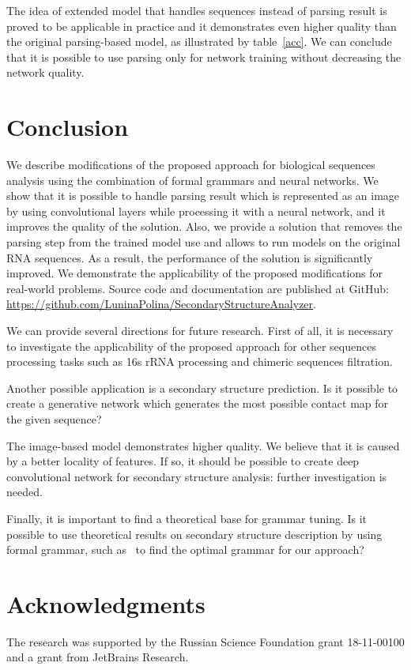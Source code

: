 \documentclass[12pt,a4paper]{cibb}
\begin{document}
The idea of extended model that handles sequences instead of parsing result is proved to be applicable in practice and it demonstrates even higher quality than the original parsing-based model, as illustrated by table~\ref{acc}.
We can conclude that it is possible to use parsing only for network training without decreasing the network quality.

\section{\bf Conclusion}

We describe modifications of the proposed approach for biological sequences analysis using the combination of formal grammars and neural networks.
We show that it is possible to handle parsing result which is represented as an image by using convolutional layers while processing it with a neural network, and it improves the quality of the solution.
Also, we provide a solution that removes the parsing step from the trained model use and allows to run models on the original RNA sequences.
As a result, the performance of the solution is significantly improved.
We demonstrate the applicability of the proposed modifications for real-world problems.
Source code and documentation are published at GitHub: \url{https://github.com/LuninaPolina/SecondaryStructureAnalyzer}.

We can provide several directions for future research.
First of all, it is necessary to investigate the applicability of the proposed approach for other sequences processing tasks such as 16s rRNA processing and chimeric sequences filtration.

Another possible application is a secondary structure prediction.
Is it possible to create a generative network which generates the most possible contact map for the given sequence?

The image-based model demonstrates higher quality.
We believe that it is caused by a better locality of features.
If so, it should be possible to create deep convolutional network for secondary structure analysis: further investigation is needed.

Finally, it is important to find a theoretical base for grammar tuning.
Is it possible to use theoretical results on secondary structure description by using formal grammar, such as~\cite{MQbioinformatics19} to find the optimal grammar for our approach?


\section*{\bf Acknowledgments}

The research was supported by the Russian Science Foundation grant 18-11-00100 and a grant from JetBrains Research.



%


{\fontsize{10}{10}\selectfont
\setlength{\parskip}{0pt}



}
\end{document}
